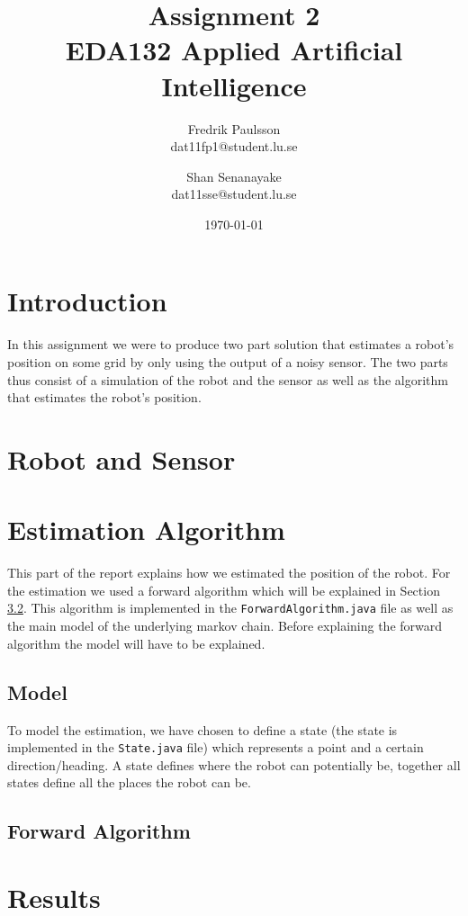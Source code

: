 \documentclass[a4paper]{article}
\title{Assignment 2 \\ EDA132 Applied Artificial Intelligence}
\date{\today}
\author{Fredrik Paulsson \\ dat11fp1@student.lu.se
\and Shan Senanayake \\ dat11sse@student.lu.se}
\begin{document}
\maketitle


\section{Introduction} In this assignment we were to produce two part solution
that estimates a robot's position on some grid by only using the output of a
noisy sensor. The two parts thus consist of a simulation of the robot and the
sensor as well as the algorithm that estimates the robot's position.

\section{Robot and Sensor}



\section{Estimation Algorithm}
This part of the report explains how we estimated the position of the robot. 
For the estimation we used a forward algorithm which will be explained in Section \ref{for_alg}. This algorithm is implemented in the \texttt{ForwardAlgorithm.java} file as well as the main model of the underlying markov chain. Before explaining the forward algorithm the model will have to be explained.

\subsection{Model}
To model the estimation, we have chosen to define a state (the state is implemented in the \texttt{State.java} file) which represents a point and a certain direction/heading. A state defines where the robot can potentially be, together all states define all the places the robot can be.   


\subsection{Forward Algorithm}
\label{for_alg}


\section{Results}
\end{document}
